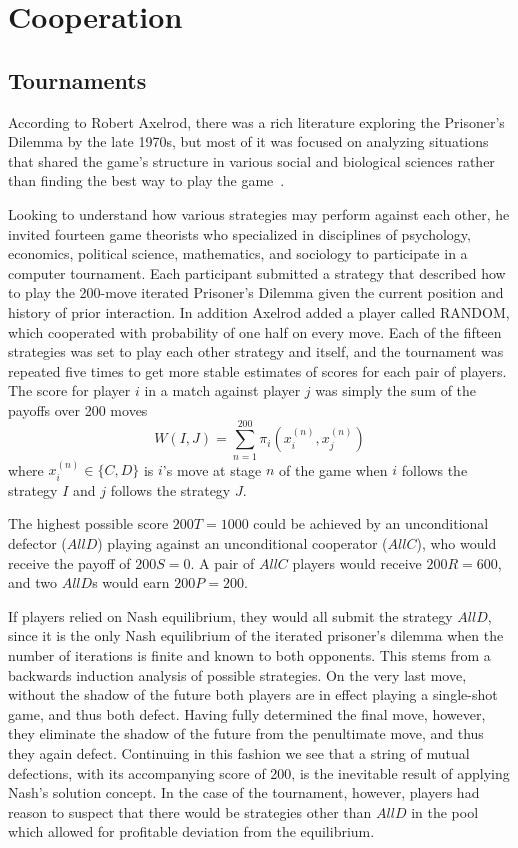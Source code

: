 \chapter{Cooperation}
\section{Tournaments}
According to Robert Axelrod, there was a rich literature exploring the Prisoner's Dilemma by the late 1970s, but most of it was focused on analyzing situations that shared the game's structure in various social and biological sciences rather than finding the best way to play the game~\cite[p.28]{axelrod1984evolution}.

Looking to understand how various strategies may perform against each other, he invited fourteen game theorists who specialized in disciplines of psychology, economics, political science, mathematics, and sociology to participate in a computer tournament. Each participant submitted a strategy  that described how to play the 200-move iterated Prisoner's Dilemma given the current position and history of prior interaction. In addition Axelrod added a player called RANDOM, which cooperated with probability of one half on every move. Each of the fifteen strategies was set to play each other strategy and itself, and the tournament was repeated five times to get more stable estimates of scores for each pair of players. The score for player $i$ in a match against player $j$ was simply the sum of the payoffs over 200 moves
\[
W(I, J) = \sum_{n=1}^{200} \pi_i(x_i^{(n)}, x_j^{(n)}) 
\]
where $x_i^{(n)} \in \{C, D\}$ is $i$'s move at stage $n$ of the game when $i$ follows the strategy $I$ and $j$ follows the strategy $J$.

The highest possible score $200 T = 1000$ could be achieved by an unconditional defector ($AllD$) playing against an unconditional cooperator ($AllC$), who would receive the payoff of $200 S = 0$. A pair of $AllC$ players would receive $200 R = 600$, and two $AllD$s would earn $200 P = 200$.

If players relied on Nash equilibrium, they would all submit the strategy $AllD$, since it is the only Nash equilibrium of the iterated prisoner's dilemma when the number of iterations is finite and known to both opponents. This stems from a backwards induction analysis of possible strategies. On the very last move, without the shadow of the future both players are in effect playing a single-shot game, and thus both defect. Having fully determined the final move, however, they eliminate the shadow of the future from the penultimate move, and thus they again defect. Continuing in this fashion we see that a string of mutual defections, with its accompanying score of 200, is the inevitable result of applying Nash's solution concept. In the case of the tournament, however, players had reason to suspect that there would be strategies other than $AllD$ in the pool which allowed for profitable deviation from the equilibrium.

